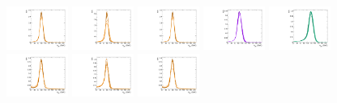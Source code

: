 \begin{figure}[htbp]
  \centering
  \includegraphics[width=0.18\textwidth]{fig/analysisAppendix/templateSignalVsMX_fromDC_GbuToWW_MJJ_mu_HP_bb_LDy.pdf}
  \includegraphics[width=0.18\textwidth]{fig/analysisAppendix/templateSignalVsMX_fromDC_RadToWW_MJJ_mu_HP_bb_LDy.pdf}
  \includegraphics[width=0.18\textwidth]{fig/analysisAppendix/templateSignalVsMX_fromDC_ZprToWW_MJJ_mu_HP_bb_LDy.pdf}
  \includegraphics[width=0.18\textwidth]{fig/analysisAppendix/templateSignalVsMX_fromDC_WprToWZ_MJJ_mu_HP_bb_LDy.pdf}
  \includegraphics[width=0.18\textwidth]{fig/analysisAppendix/templateSignalVsMX_fromDC_WprToWH_MJJ_mu_HP_bb_LDy.pdf}\\
  \includegraphics[width=0.18\textwidth]{fig/analysisAppendix/templateSignalVsMX_fromDC_GbuToWW_MJJ_mu_LP_bb_LDy.pdf}
  \includegraphics[width=0.18\textwidth]{fig/analysisAppendix/templateSignalVsMX_fromDC_RadToWW_MJJ_mu_LP_bb_LDy.pdf}
  \includegraphics[width=0.18\textwidth]{fig/analysisAppendix/templateSignalVsMX_fromDC_ZprToWW_MJJ_mu_LP_bb_LDy.pdf}

\end{figure}
